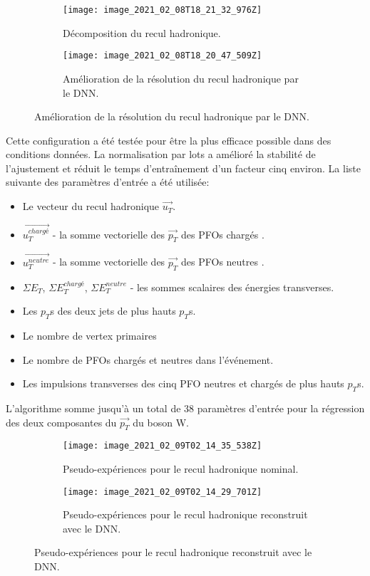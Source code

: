 \begin{figure}[htbp]
	\begin{subfigure}[t]{0.48\textwidth}
		\texttt{[image: image\_2021\_02\_08T18\_21\_32\_976Z]}
		\caption[Bootstrap HR]{Décomposition du recul hadronique.}
		\label{fig::hr_decomp}
	\end{subfigure}
	\hfill
	\begin{subfigure}[t]{0.48\textwidth}
		\texttt{[image: image\_2021\_02\_08T18\_20\_47\_509Z]}
		\caption[Bootstrap HR MVA]{Amélioration de la résolution du recul hadronique par le DNN.}
		\label{fig::hr_resolution}
	\end{subfigure}
	\label{fig::hr_ss}
\end{figure}


Cette configuration a été testée pour être la plus efficace possible dans des conditions données. La normalisation par lots a amélioré la stabilité de l'ajustement et réduit le temps d'entraînement d'un facteur cinq environ. La liste suivante des paramètres d'entrée a été utilisée:
\begin {itemize}
\item Le vecteur du recul hadronique $\vec{u_{T}} $.
\item $\vec{u^{chargé}_{T}} $ - la somme vectorielle des $\vec{p_ {T}}$ des PFOs chargés .
\item $\vec{u^{neutre}_{T}} $ - la somme vectorielle des $\vec{p_ {T}}$ des PFOs neutres .
\item $\Sigma E_T$, $\Sigma E^{chargé}_T$, $\Sigma E^ {neutre}_T$ - les sommes scalaires des énergies transverses.
\item Les $p_T$s des deux jets de plus hauts $p_T$s.
\item Le nombre de vertex primaires
\item Le nombre de PFOs chargés et neutres dans l'événement.
\item Les impulsions transverses des cinq PFO neutres et chargés de plus hauts $p_T$s.
\end {itemize}
L'algorithme somme jusqu'à un total de 38 paramètres d'entrée pour la régression des deux composantes du $\vec{p_T}$ du boson W.


\begin{figure}[htbp]
	\begin{subfigure}[t]{0.48\textwidth}
		\texttt{[image: image\_2021\_02\_09T02\_14\_35\_538Z]}
		\caption[Bootstrap HR]{Pseudo-expériences pour le recul hadronique nominal.}
		\label{fig::boot}
	\end{subfigure}
	\hfill
	\begin{subfigure}[t]{0.48\textwidth}
		\texttt{[image: image\_2021\_02\_09T02\_14\_29\_701Z]}
		\caption[Bootstrap HR MVA]{Pseudo-expériences pour le recul hadronique reconstruit avec le DNN.}
		\label{fig::boot_mva}
	\end{subfigure}
	\label{fig::nn_s}
\end{figure}


